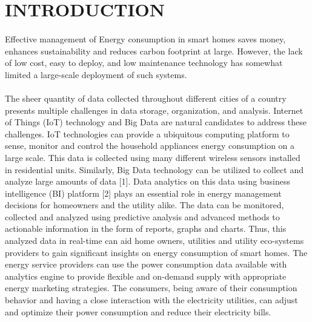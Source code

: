 \documentclass[a4paper,12pt,oneside]{article}
\begin{document}
\newpage
\begin{center}
\tableofcontents
\end{center}



\newpage
\thispagestyle{plain}
\begin{center}
\listoffigures
\end{center}



\newpage
\rfoot{\thepage}
\rfoot{\thepage}
\renewcommand{\headrulewidth}{0.0pt}
\renewcommand{\footrulewidth}{0.0pt}
\renewcommand{\headrulewidth}{0.0pt}
\renewcommand{\footrulewidth}{0.0pt}
\section{INTRODUCTION}
\paragraph{}
Effective management of Energy consumption in smart homes saves money,
enhances sustainability and reduces carbon footprint at
large. However, the lack of low cost, easy to deploy, and low
maintenance technology has somewhat limited a large-scale deployment of such systems.
\paragraph{}
The sheer quantity of data
collected throughout different cities of a country presents
multiple challenges in data storage, organization, and analysis.
Internet of Things (IoT) technology and Big Data are natural
candidates to address these challenges. IoT technologies can
provide a ubiquitous computing platform to sense, monitor
and control the household appliances energy consumption on a
large scale. This data is collected using many different
wireless sensors installed in residential units. Similarly, Big
Data technology can be utilized to collect and analyze large
amounts of data [1]. Data analytics on this data using business
intelligence (BI) platform [2] plays an essential role in energy
management decisions for homeowners and the utility alike.
The data can be monitored, collected and analyzed using
predictive analysis and advanced methods to actionable
information in the form of reports, graphs and charts. Thus,
this analyzed data in real-time can aid home owners, utilities
and utility eco-systems providers to gain significant insights
on energy consumption of smart homes. The energy service
providers can use the power consumption data available with
analytics engine to provide flexible and on-demand supply
with appropriate energy marketing strategies. The consumers,
being aware of their consumption behavior and having a close
interaction with the electricity utilities, can adjust and
optimize their power consumption and reduce their electricity
bills.
\end{document}
